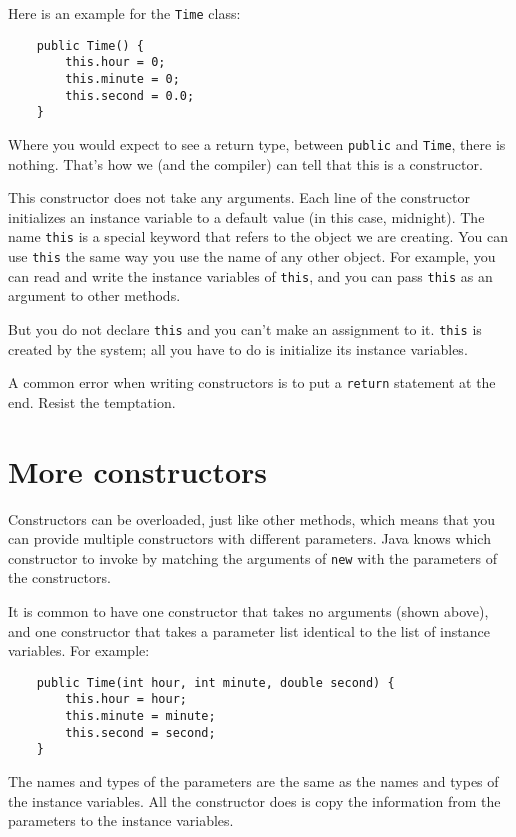 \documentclass[12pt]{book}
\theoremstyle{definition}
\begin{document}
Here is an example for the {\tt Time} class:

\begin{lstlisting}
    public Time() {
        this.hour = 0;
        this.minute = 0;
        this.second = 0.0;
    }
\end{lstlisting}
%
Where you would expect to see a return type,
between {\tt public} and {\tt Time}, there is nothing.  That's
how we (and the compiler) can tell that this is a constructor.

This constructor does not take any arguments.  Each line of the
constructor initializes an instance variable to a default
value (in this case, midnight).  The name {\tt this} is a special
keyword that refers to the object we are creating.  You can use
{\tt this} the same way you use the name of any other object.  For
example, you can read and write the instance variables of {\tt this},
and you can pass {\tt this} as an argument to other methods.


But you do not declare {\tt this} and you can't make an
assignment to it.  {\tt this} is created by the system; all you
have to do is initialize its instance variables.

A common error when writing constructors is to put a {\tt return}
statement at the end.  Resist the temptation.


\section{More constructors}

Constructors can be overloaded, just like other methods,
which means that you can provide multiple constructors
with different parameters.  Java knows which constructor
to invoke by matching the arguments of {\tt new}
with the parameters of the constructors.

It is common to have one constructor that takes no
arguments (shown above), and one constructor that takes
a parameter list identical to the list of instance
variables.  For example:

\begin{lstlisting}
    public Time(int hour, int minute, double second) {
        this.hour = hour;
        this.minute = minute;
        this.second = second;
    }
\end{lstlisting}
%
The names and types of the parameters are the same as
the names and types of the instance variables.  All the
constructor does is copy the information from the parameters
to the instance variables.
\end{document}
